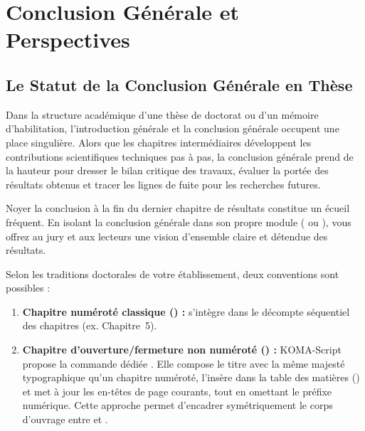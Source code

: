 \chapter{Conclusion Générale et Perspectives}
\label{chap:conclusion-generale}

\section{Le Statut de la Conclusion Générale en Thèse}
\label{sec:conclusion-statut}

Dans la structure académique d'une thèse de doctorat ou d'un mémoire d'habilitation,
l'introduction générale et la conclusion générale occupent une place singulière.
Alors que les chapitres intermédiaires développent les contributions scientifiques techniques pas à pas,
la conclusion générale prend de la hauteur pour dresser le bilan critique des travaux,
évaluer la portée des résultats obtenus et tracer les lignes de fuite pour les recherches futures.

Noyer la conclusion à la fin du dernier chapitre de résultats constitue un écueil fréquent.
En isolant la conclusion générale dans son propre module ( ou ),
vous offrez au jury et aux lecteurs une vision d'ensemble claire et détendue des résultats.

\begin{callout}
Selon les traditions doctorales de votre établissement, deux conventions sont possibles :
\begin{enumerate}
  \item \textbf{Chapitre numéroté classique () :}
  s'intègre dans le décompte séquentiel des chapitres (ex. Chapitre~5).
  \item \textbf{Chapitre d'ouverture/fermeture non numéroté () :}
  KOMA-Script propose la commande dédiée .
  Elle compose le titre avec la même majesté typographique qu'un chapitre numéroté,
  l'insère dans la table des matières ()
  et met à jour les en-têtes de page courants, tout en omettant le préfixe numérique.
  Cette approche permet d'encadrer symétriquement le corps d'ouvrage
  entre  et .
\end{enumerate}
\end{callout}

